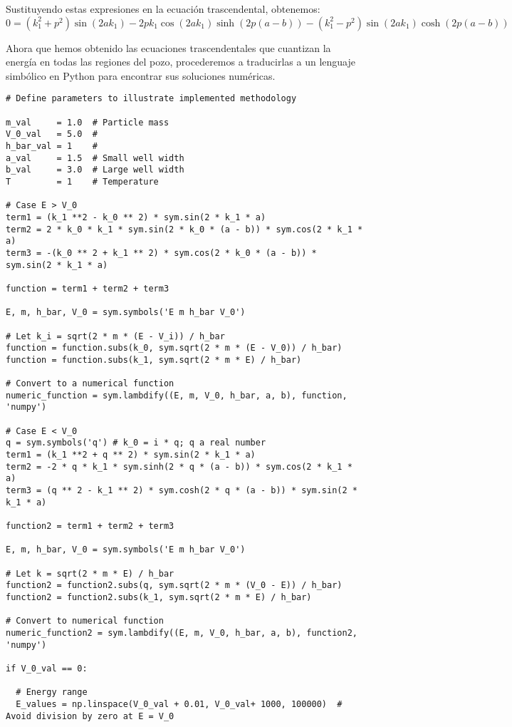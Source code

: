 \documentclass[11pt]{article}
\begin{document}
Sustituyendo estas expresiones en la ecuación trascendental, obtenemos:
$$ \boxed{0 = (k_1^2 + p^2)\sin(2ak_1) - 2pk_1 \cos(2ak_1)
\sinh(2p(a - b)) -(k_1^2 - p^2) \sin(2 a k_1) \cosh(2p (a - b))}
$$

Ahora que hemos obtenido las ecuaciones trascendentales que cuantizan la
energía en todas las regiones del pozo, procederemos a traducirlas a un
lenguaje simbólico en Python para encontrar sus soluciones numéricas.

\begin{verbatim}
# Define parameters to illustrate implemented methodology

m_val     = 1.0  # Particle mass
V_0_val   = 5.0  #
h_bar_val = 1    #
a_val     = 1.5  # Small well width
b_val     = 3.0  # Large well width
T         = 1    # Temperature

# Case E > V_0
term1 = (k_1 **2 - k_0 ** 2) * sym.sin(2 * k_1 * a)
term2 = 2 * k_0 * k_1 * sym.sin(2 * k_0 * (a - b)) * sym.cos(2 * k_1 * a)
term3 = -(k_0 ** 2 + k_1 ** 2) * sym.cos(2 * k_0 * (a - b)) * sym.sin(2 * k_1 * a)

function = term1 + term2 + term3

E, m, h_bar, V_0 = sym.symbols('E m h_bar V_0')

# Let k_i = sqrt(2 * m * (E - V_i)) / h_bar
function = function.subs(k_0, sym.sqrt(2 * m * (E - V_0)) / h_bar)
function = function.subs(k_1, sym.sqrt(2 * m * E) / h_bar)

# Convert to a numerical function
numeric_function = sym.lambdify((E, m, V_0, h_bar, a, b), function, 'numpy')

# Case E < V_0
q = sym.symbols('q') # k_0 = i * q; q a real number
term1 = (k_1 **2 + q ** 2) * sym.sin(2 * k_1 * a)
term2 = -2 * q * k_1 * sym.sinh(2 * q * (a - b)) * sym.cos(2 * k_1 * a)
term3 = (q ** 2 - k_1 ** 2) * sym.cosh(2 * q * (a - b)) * sym.sin(2 * k_1 * a)

function2 = term1 + term2 + term3

E, m, h_bar, V_0 = sym.symbols('E m h_bar V_0')

# Let k = sqrt(2 * m * E) / h_bar
function2 = function2.subs(q, sym.sqrt(2 * m * (V_0 - E)) / h_bar)
function2 = function2.subs(k_1, sym.sqrt(2 * m * E) / h_bar)

# Convert to numerical function
numeric_function2 = sym.lambdify((E, m, V_0, h_bar, a, b), function2, 'numpy')

if V_0_val == 0:

  # Energy range
  E_values = np.linspace(V_0_val + 0.01, V_0_val+ 1000, 100000)  # Avoid division by zero at E = V_0


\end{verbatim}
\end{document}
